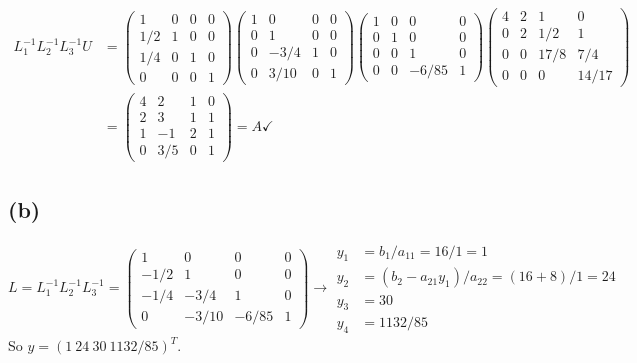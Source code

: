 \documentclass[12pt]{article}
\begin{document}
			\begin{align*} 
			L_{1}^{-1}L_{2}^{-1}L_{3}^{-1}U &= \begin{pmatrix}
			1 & 0 & 0 & 0 \\
			1/2 & 1 & 0 & 0 \\
			1/4 & 0 & 1 & 0 \\
			0 & 0 & 0 & 1 
			\end{pmatrix}
	\begin{pmatrix}
		1 & 0 & 0 & 0 \\
		0 & 1 & 0 & 0 \\
		0 & -3/4 & 1 & 0 \\
		0 & 3/10 & 0 & 1 
		\end{pmatrix}
	\begin{pmatrix}
	1 & 0 & 0 & 0 \\
	0 & 1 & 0 & 0 \\
	0 & 0 & 1 & 0 \\
	0 & 0 & -6/85 & 1 
	\end{pmatrix}
\begin{pmatrix}
4 & 2 & 1 & 0 \\ 
0 & 2 & 1/2 & 1 \\
0 & 0 & 17/8 & 7/4 \\
0 & 0 & 0 & 14/17
\end{pmatrix}  \\ &= \begin{pmatrix}
4 & 2 & 1 & 0 \\ 
2 & 3 & 1 & 1 \\
1 & -1 & 2 & 1 \\
0 & 3/5 & 0 & 1 
\end{pmatrix} = A \checkmark
\end{align*}
		\subsection*{(b)}
			$$L = L_{1}^{-1} L_{2}^{-1} L_{3}^{-1} = \begin{pmatrix}
				1 & 0 & 0 & 0 \\
				-1/2 & 1 & 0 & 0 \\
				-1/4 & -3/4 & 1 & 0 \\
				0 & -3/10 & -6/85 & 1
			\end{pmatrix}\to \begin{align*}
				y_{1} &= b_{1} /a_{11} = 16/1 =1 \\
				y_{2} &= (b_{2} - a_{21}y_{1})/a_{22} = (16 +8)/1 =24\\
				y_{3} &= 30 \\
				y_{4} &= 1132/85
			\end{align*}$$
			So $y = (1 \ 24 \ 30 \  1132/85)^{T}.$
\end{document}
